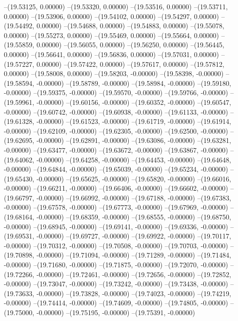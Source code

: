 --(19.53125, 0.00000)
--(19.53320, 0.00000)
--(19.53516, 0.00000)
--(19.53711, 0.00000)
--(19.53906, 0.00000)
--(19.54102, 0.00000)
--(19.54297, 0.00000)
--(19.54492, 0.00000)
--(19.54688, 0.00000)
--(19.54883, 0.00000)
--(19.55078, 0.00000)
--(19.55273, 0.00000)
--(19.55469, 0.00000)
--(19.55664, 0.00000)
--(19.55859, 0.00000)
--(19.56055, 0.00000)
--(19.56250, 0.00000)
--(19.56445, 0.00000)
--(19.56641, 0.00000)
--(19.56836, 0.00000)
--(19.57031, 0.00000)
--(19.57227, 0.00000)
--(19.57422, 0.00000)
--(19.57617, 0.00000)
--(19.57812, 0.00000)
--(19.58008, 0.00000)
--(19.58203, -0.00000)
--(19.58398, -0.00000)
--(19.58594, -0.00000)
--(19.58789, -0.00000)
--(19.58984, -0.00000)
--(19.59180, -0.00000)
--(19.59375, -0.00000)
--(19.59570, -0.00000)
--(19.59766, -0.00000)
--(19.59961, -0.00000)
--(19.60156, -0.00000)
--(19.60352, -0.00000)
--(19.60547, -0.00000)
--(19.60742, -0.00000)
--(19.60938, -0.00000)
--(19.61133, -0.00000)
--(19.61328, -0.00000)
--(19.61523, -0.00000)
--(19.61719, -0.00000)
--(19.61914, -0.00000)
--(19.62109, -0.00000)
--(19.62305, -0.00000)
--(19.62500, -0.00000)
--(19.62695, -0.00000)
--(19.62891, -0.00000)
--(19.63086, -0.00000)
--(19.63281, -0.00000)
--(19.63477, -0.00000)
--(19.63672, -0.00000)
--(19.63867, -0.00000)
--(19.64062, -0.00000)
--(19.64258, -0.00000)
--(19.64453, -0.00000)
--(19.64648, -0.00000)
--(19.64844, -0.00000)
--(19.65039, -0.00000)
--(19.65234, -0.00000)
--(19.65430, -0.00000)
--(19.65625, -0.00000)
--(19.65820, -0.00000)
--(19.66016, -0.00000)
--(19.66211, -0.00000)
--(19.66406, -0.00000)
--(19.66602, -0.00000)
--(19.66797, -0.00000)
--(19.66992, -0.00000)
--(19.67188, -0.00000)
--(19.67383, -0.00000)
--(19.67578, -0.00000)
--(19.67773, -0.00000)
--(19.67969, -0.00000)
--(19.68164, -0.00000)
--(19.68359, -0.00000)
--(19.68555, -0.00000)
--(19.68750, -0.00000)
--(19.68945, -0.00000)
--(19.69141, -0.00000)
--(19.69336, -0.00000)
--(19.69531, -0.00000)
--(19.69727, -0.00000)
--(19.69922, -0.00000)
--(19.70117, -0.00000)
--(19.70312, -0.00000)
--(19.70508, -0.00000)
--(19.70703, -0.00000)
--(19.70898, -0.00000)
--(19.71094, -0.00000)
--(19.71289, -0.00000)
--(19.71484, -0.00000)
--(19.71680, -0.00000)
--(19.71875, -0.00000)
--(19.72070, -0.00000)
--(19.72266, -0.00000)
--(19.72461, -0.00000)
--(19.72656, -0.00000)
--(19.72852, -0.00000)
--(19.73047, -0.00000)
--(19.73242, -0.00000)
--(19.73438, -0.00000)
--(19.73633, -0.00000)
--(19.73828, -0.00000)
--(19.74023, -0.00000)
--(19.74219, -0.00000)
--(19.74414, -0.00000)
--(19.74609, -0.00000)
--(19.74805, -0.00000)
--(19.75000, -0.00000)
--(19.75195, -0.00000)
--(19.75391, -0.00000)
